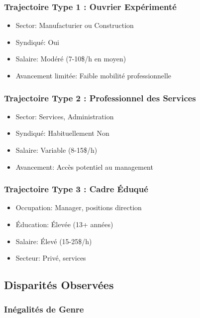 \documentclass[12pt,a4paper]{report}
\begin{document}
\subsubsection{Trajectoire Type 1 : Ouvrier Expérimenté}

\begin{itemize}
    \item Sector: Manufacturier ou Construction
    \item Syndiqué: Oui
    \item Salaire: Modéré (7-10\$/h en moyen)
    \item Avancement limitée: Faible mobilité professionnelle
\end{itemize}

\subsubsection{Trajectoire Type 2 : Professionnel des Services}

\begin{itemize}
    \item Sector: Services, Administration
    \item Syndiqué: Habituellement Non
    \item Salaire: Variable (8-15\$/h)
    \item Avancement: Accès potentiel au management
\end{itemize}

\subsubsection{Trajectoire Type 3 : Cadre Éduqué}

\begin{itemize}
    \item Occupation: Manager, positions direction
    \item Éducation: Élevée (13+ années)
    \item Salaire: Élevé (15-25\$/h)
    \item Secteur: Privé, services
\end{itemize}

\subsection{Disparités Observées}

\subsubsection{Inégalités de Genre}
\end{document}
